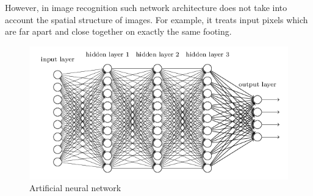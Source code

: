 However, in image recognition such network architecture does not take into account the spatial structure of images. For example, it treats input pixels which are far apart and close together on exactly the same footing. \par
\begin{figure}[ht]
  \centering
    \includegraphics[scale=0.5, width=\linewidth]{figs/Deep_Learning.png}
  \caption{Artificial neural network \cite{vggnet}}
  \label{fig:fcnn}
\end{figure}
